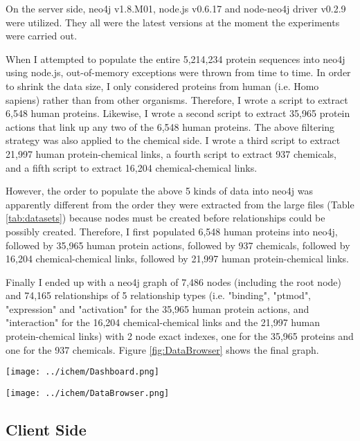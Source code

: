 \documentclass[10pt,conference,compsocconf]{IEEEtran}
\begin{document}
On the server side, neo4j v1.8.M01, node.js v0.6.17 and node-neo4j driver v0.2.9 were utilized. They all were the latest versions at the moment the experiments were carried out.

When I attempted to populate the entire 5,214,234 protein sequences into neo4j using node.js, out-of-memory exceptions were thrown from time to time. In order to shrink the data size, I only considered proteins from human (i.e. Homo sapiens) rather than from other organisms. Therefore, I wrote a script to extract 6,548 human proteins. Likewise, I wrote a second script to extract 35,965 protein actions that link up any two of the 6,548 human proteins. The above filtering strategy was also applied to the chemical side. I wrote a third script to extract 21,997 human protein-chemical links, a fourth script to extract 937 chemicals, and a fifth script to extract 16,204 chemical-chemical links.

However, the order to populate the above 5 kinds of data into neo4j was apparently different from the order they were extracted from the large files (Table \ref{tab:datasets}) because nodes must be created before relationships could be possibly created. Therefore, I first populated 6,548 human proteins into neo4j, followed by 35,965 human protein actions, followed by 937 chemicals, followed by 16,204 chemical-chemical links, followed by 21,997 human protein-chemical links.

Finally I ended up with a neo4j graph of 7,486 nodes (including the root node) and 74,165 relationships of 5 relationship types (i.e. "binding", "ptmod", "expression" and "activation" for the 35,965 human protein actions, and "interaction" for the 16,204 chemical-chemical links and the 21,997 human protein-chemical links) with 2 node exact indexes, one for the 35,965 proteins and one for the 937 chemicals. Figure \ref{fig:DataBrowser} shows the final graph.

\begin{figure*}
\centering
\texttt{[image: ../ichem/Dashboard.png]}
\caption{Neo4j dashboard.}
\label{fig:Dashboard}
\end{figure*}

\begin{figure*}
\centering
\texttt{[image: ../ichem/DataBrowser.png]}
\caption{Neo4j data browser.}
\label{fig:DataBrowser}
\end{figure*}

\subsection{Client Side}
\end{document}
